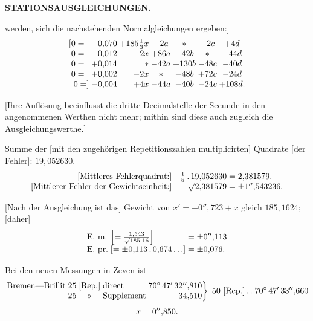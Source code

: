 \par\clearpage
\noindent\null\hfill{\small\textbf{STATIONSAUSGLEICHUNGEN.}}\hfill{}\par\medskip

\noindent werden, sich die nachstehenden Normalgleichungen ergeben:]
\[
\begin{array}{@{}r@{\;}r@{\;}r@{\;}c@{\;}c@{\;}c@{\;}c@{}}
 [0=\phantom{]}&-0{,}070&+185\frac13x&-2a&\ast&-2c&+4d\\
 0=\phantom{]}&-0{,}012&-2x&+86a&-42b&\ast&-44d\\
 0=\phantom{]}&+0{,}014&\ast&-42a&+130b&-48c&-40d\\
 0=\phantom{]}&+0{,}002&-2x&\ast&-48b&+72c&-24d\\
 0=]&-0{,}004&+4x&-44a&-40b&-24c&+108d.
\end{array}
\]

[Ihre Auflösung beeinflusst die dritte Decimalstelle der Secunde in den angenommenen Werthen nicht mehr; mithin sind diese auch zugleich die Ausgleichungswerthe.]

Summe der [mit den zugehörigen Repetitionszahlen multiplicirten] Quadrate [der Fehler]: \(19{,}052630.\)
\[
\begin{array}{@{}r@{\quad}r@{\;=\;}l@{}}
 \text{[Mittleres Fehlerquadrat:]}&
 \frac18\,.\,19{,}052630&2{,}381579.\\
 \text{[Mittlerer Fehler der Gewichtseinheit:]}&
 \surd 2{,}381579&\pm1''{,}543236.
\end{array}
\]

[Nach der Ausgleichung ist das] Gewicht von \(x'=+0''{,}723+x\) gleich \(185{,}1624\); [daher]
\[
\begin{array}{@{}l@{\;}l@{\;=\;}l@{}}
 \text{E.\ m.}&\left[=\frac{1{,}543}{\surd 185{,}16}\right]&\pm0''{,}113\\
 \text{E.\ pr.}&[=\pm0{,}113\,.\,0{,}674\ldots]&\pm0{,}076.
\end{array}
\]

Bei den neuen Messungen in Zeven ist
\[
\begin{gathered}
 \left.\begin{array}{@{}l@{\;}r@{\;}c@{\;}l@{\;}r@{}}
 \text{Bremen—Brillit}&25&\text{[Rep.]}&\text{direct}&70^\circ\,47'\,32''{,}810\\
 &25&\text{»}&\text{Supplement}&34{,}510
 \end{array}\right\}\;50\text{ [Rep.]}\,.\,.\;70^\circ\,47'\,33''{,}660\\[3pt]
 x=0''{,}850.
\end{gathered}
\]

